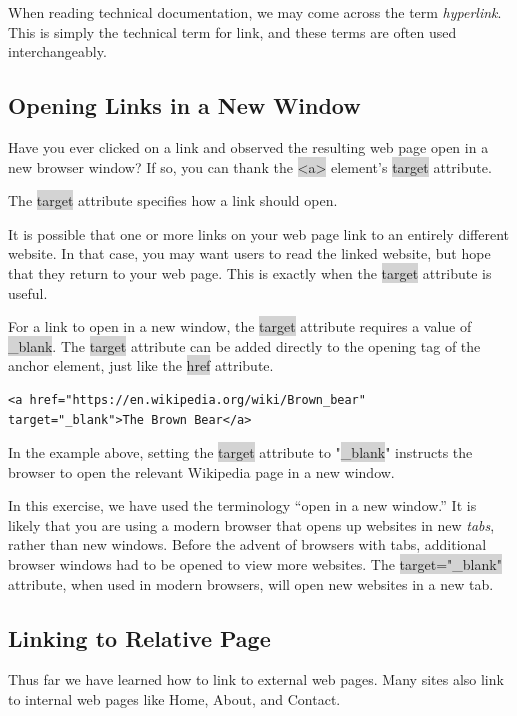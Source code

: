 \documentclass[11pt]{article}
\begin{document}
When reading technical documentation, we may come across the term \textit{hyperlink}. This is simply the technical term for link, and these terms are often used interchangeably.

\subsection{Opening Links in a New Window}
Have you ever clicked on a link and observed the resulting web page open in a new browser window? If so, you can thank the \colorbox{lightgray}{<a>} element’s \colorbox{lightgray}{target} attribute.

The \colorbox{lightgray}{target} attribute specifies how a link should open.

It is possible that one or more links on your web page link to an entirely different website. In that case, you may want users to read the linked website, but hope that they return to your web page. This is exactly when the \colorbox{lightgray}{target} attribute is useful.

For a link to open in a new window, the \colorbox{lightgray}{target} attribute requires a value of \colorbox{lightgray}{\_blank}. The \colorbox{lightgray}{target} attribute can be added directly to the opening tag of the anchor element, just like the \colorbox{lightgray}{href} attribute.
\begin{lstlisting}
<a href="https://en.wikipedia.org/wiki/Brown_bear" 
target="_blank">The Brown Bear</a>
\end{lstlisting}
In the example above, setting the \colorbox{lightgray}{target} attribute to "\colorbox{lightgray}{\_blank}" instructs the browser to open the relevant Wikipedia page in a new window.

In this exercise, we have used the terminology “open in a new window.” It is likely that you are using a modern browser that opens up websites in new \textit{tabs}, rather than new windows. Before the advent of browsers with tabs, additional browser windows had to be opened to view more websites. The \colorbox{lightgray}{target="\_blank"} attribute, when used in modern browsers, will open new websites in a new tab.

\subsection{Linking to Relative Page}
Thus far we have learned how to link to external web pages. Many sites also link to internal web pages like Home, About, and Contact.
\end{document}
